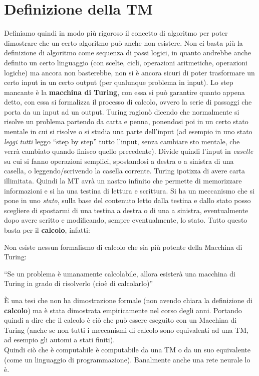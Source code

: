 \documentclass[a4paper,12pt, oneside]{book}
\begin{document}
\section{Definizione della TM}
Definiamo quindi in modo più rigoroso il concetto di algoritmo per poter
dimostrare che un certo algoritmo può anche non esistere. Non ci basta più la
definizione di algoritmo come sequenza di passi logici, in quanto andrebbe anche
definito un certo linguaggio (con scelte, cicli, operazioni aritmetiche,
operazioni logiche) ma ancora non basterebbe, non si è ancora sicuri di poter
trasformare un certo input in un certo output (per qualunque problema in
input). Lo step mancante è la \textbf{macchina di Turing}, con essa si può
garantire quanto appena detto, con essa si formalizza il processo di calcolo,
ovvero la serie di passaggi che porta da un input ad un output. Turing ragionò
dicendo che normalmente si risolve un problema partendo da carta e penna,
ponendosi poi in un certo stato mentale in cui si risolve o si studia una parte
dell'input (ad esempio in uno stato \textit{leggi tutti} leggo ``step by step''
tutto l'input, senza cambiare sto mentale, che verrà cambiato quando finisco
quello precedente). Divide quindi l'input in \textit{caselle} su cui si fanno
operazioni semplici, spostandosi a destra o a sinistra di una casella, o
leggendo/scrivendo la casella corrente. Turing ipotizza di avere carta
illimitata. Quindi la MT avrà un nastro infinito che permette di memorizzare
informazioni e si ha una testina di lettura e scrittura. Si ha un meccanismo che
si pone in uno \textit{stato}, sulla base del contenuto letto dalla testina e
dallo stato posso scegliere di spostarmi di una testina a destra o di una a
sinistra, eventualmente dopo avere scritto e modificando, sempre eventualmente,
lo stato. Tutto questo basta per il \textbf{calcolo}, infatti:
\begin{teorema}
  Non esiste nessun formalismo di calcolo che sia più
  potente della Macchina di Turing:
  \begin{center}
   ``Se un problema è umanamente calcolabile, allora esisterà una macchina di
    Turing in grado di risolverlo (cioè di calcolarlo)''
  \end{center}
  È una tesi che non ha dimostrazione formale (non avendo chiara la definizione
  di \textbf{calcolo}) ma è stata dimostrata
  empiricamente nel corso degli anni. Portando quindi a dire che il calcolo è
  ciò che può essere eseguito con un Macchina di Turing (anche se non tutti i
  meccanismi di calcolo sono equivalenti ad una TM, ad esempio gli automi a
  stati finiti).\\
  Quindi ciò che è computabile è computabile da una TM o da un suo equivalente
  (come un linguaggio di programmazione). Banalmente anche una rete neurale lo
  è. 
\end{teorema}
\end{document}
